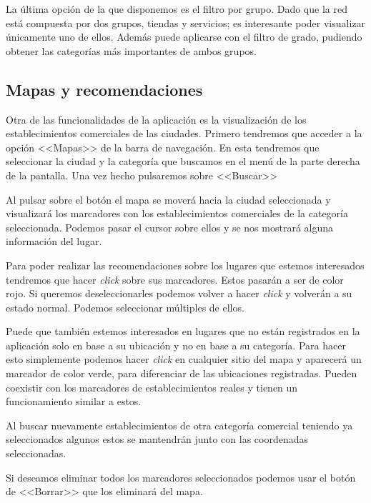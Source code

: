 
La última opción de la que disponemos es el filtro por grupo. Dado que la red está compuesta por dos grupos, tiendas y servicios; es interesante poder visualizar únicamente uno de ellos. Además puede aplicarse con el filtro de grado, pudiendo obtener las categorías más importantes de ambos grupos.


\subsection{Mapas y recomendaciones}

Otra de las funcionalidades de la aplicación es la visualización de los establecimientos comerciales de las ciudades. Primero tendremos que acceder a la opción <<Mapas>> de la barra de navegación. En esta tendremos que seleccionar la ciudad y la categoría que buscamos en el menú de la parte derecha de la pantalla. Una vez hecho pulsaremos sobre <<Buscar>>


Al pulsar sobre el botón el mapa se moverá hacia la ciudad seleccionada y visualizará los marcadores con los establecimientos comerciales de la categoría seleccionada. Podemos pasar el cursor sobre ellos y se nos mostrará alguna información del lugar.


Para poder realizar las recomendaciones sobre los lugares que estemos interesados tendremos que hacer \textit{click} sobre sus marcadores. Estos pasarán a ser de color rojo. Si queremos deseleccionarles podemos volver a hacer \textit{click} y volverán a su estado normal. Podemos seleccionar múltiples de ellos.


Puede que también estemos interesados en lugares que no están registrados en la aplicación solo en base a su ubicación y no en base a su categoría. Para hacer esto simplemente podemos hacer \textit{click} en cualquier sitio del mapa y aparecerá un marcador de color verde, para diferenciar de las ubicaciones registradas. Pueden coexistir con los marcadores de establecimientos reales y tienen un funcionamiento similar a estos.


Al buscar nuevamente establecimientos de otra categoría comercial teniendo ya seleccionados algunos estos se mantendrán junto con las coordenadas seleccionadas.

Si deseamos eliminar todos los marcadores seleccionados podemos usar el botón de <<Borrar>> que los eliminará del mapa.